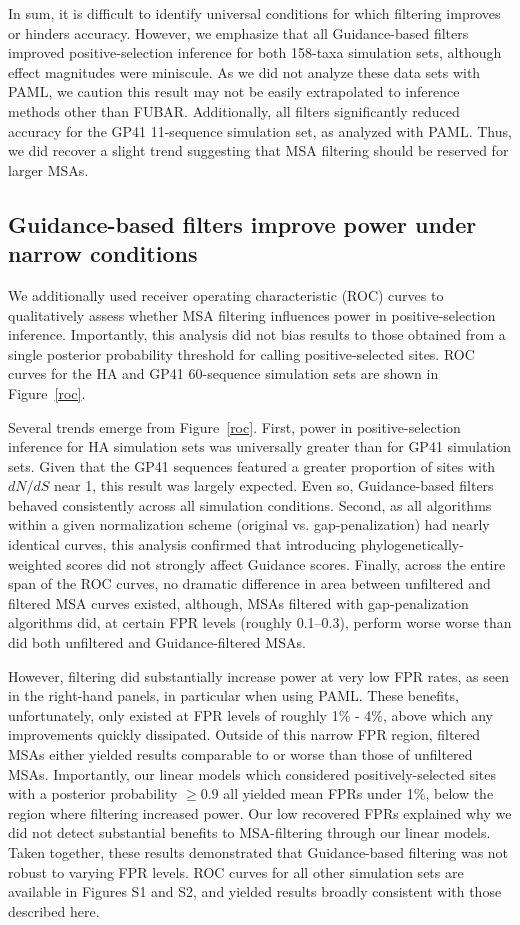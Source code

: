 \documentclass[11pt]{article}
\begin{document}
In sum, it is difficult to identify universal conditions for which filtering improves or hinders accuracy. However, we emphasize that all Guidance-based filters improved positive-selection inference for both 158-taxa simulation sets, although effect magnitudes were miniscule. As we did not analyze these data sets with PAML, we caution this result may not be easily extrapolated to inference methods other than FUBAR. Additionally, all filters significantly reduced accuracy for the GP41 11-sequence simulation set, as analyzed with PAML. 
Thus, we did recover a slight trend suggesting that MSA filtering should be reserved for larger MSAs.

\subsection*{Guidance-based filters improve power under narrow conditions}

We additionally used receiver operating characteristic (ROC) curves to qualitatively assess whether MSA filtering influences power in positive-selection inference. Importantly, this analysis did not bias results to those obtained from a single posterior probability threshold for calling positive-selected sites. ROC curves for the HA and GP41 60-sequence simulation sets are shown in Figure~\ref{roc}. 

Several trends emerge from Figure~\ref{roc}. First, power in positive-selection inference for HA simulation sets was universally greater than for GP41 simulation sets. Given that the GP41 sequences featured a greater proportion of sites with $dN/dS$ near 1, this result was largely expected. Even so, Guidance-based filters behaved consistently across all simulation conditions. Second, as all algorithms within a given normalization scheme (original vs. gap-penalization) had nearly identical curves, this analysis confirmed that introducing phylogenetically-weighted scores did not strongly affect Guidance scores. Finally, across the entire span of the ROC curves, no dramatic difference in area between unfiltered and filtered MSA curves existed, although, MSAs filtered with gap-penalization algorithms did, at certain FPR levels (roughly 0.1--0.3), perform worse worse than did both unfiltered and Guidance-filtered MSAs. 

However, filtering did substantially increase power at very low FPR rates, as seen in the right-hand panels, in particular when using PAML. These benefits, unfortunately, only existed at FPR levels of roughly 1\% - 4\%, above which any improvements quickly dissipated. Outside of this narrow FPR region, filtered MSAs either yielded results comparable to or worse than those of unfiltered MSAs. Importantly, our linear models which considered positively-selected sites with a  posterior probability $\geq 0.9$ all yielded mean FPRs under 1\%, below the region where filtering increased power. Our low recovered FPRs explained why we did not detect substantial benefits to MSA-filtering through our linear models. Taken together, these results demonstrated that Guidance-based filtering was not robust to varying FPR levels. ROC curves for all other simulation sets are available in Figures S1 and S2, and yielded results broadly consistent with those described here.
\end{document}
